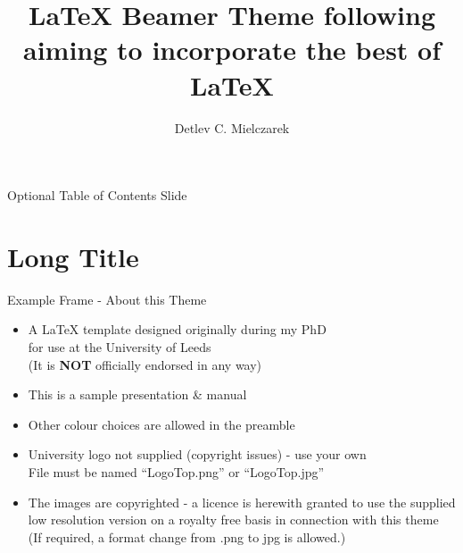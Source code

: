 \documentclass[aspectratio=43,display]{beamer}
\title[Beamer Theme]{LaTeX Beamer Theme following aiming to incorporate the best of \LaTeX}
\author[DCM] %
{%
	Detlev C. Mielczarek\inst{1}
}
\institute[UL]{\inst{1}Your Institution Here}
\begin{document}
\begin{frame}
\titlepage
\end{frame}


	





\begin{frame}{Optional Table of Contents Slide}
	\tableofcontents
\end{frame}

\section[Short Title]{Long Title}


\begin{frame}{Example Frame - About this Theme}
\begin{itemize}[<1->]
	
	\item A LaTeX template designed originally during my PhD \\ for use at the University of Leeds \\ (It is \textbf{NOT} officially endorsed in any way)
	
	\item This is a sample presentation \& manual
	
	\item Other colour choices are allowed in the preamble
	
	\item University logo not supplied (copyright issues) - use your own \\ File must be named ``LogoTop.png'' or ``LogoTop.jpg''
	
	\item The images are copyrighted - a licence is herewith granted to use the supplied low resolution version on a royalty free basis in connection with this theme \\ (If required, a format change from .png to jpg is allowed.)
\end{itemize}
\end{frame}
\end{document}
